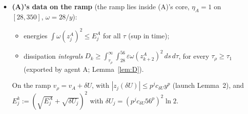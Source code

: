 \documentclass[11pt]{article}
\theoremstyle{remark}\newtheorem{remark}[theorem]{Remark}
\begin{document}
\begin{itemize}[leftmargin=*,itemsep=2pt]
\item \textbf{(A)'s data on the ramp} (the ramp lies inside (A)'s core, $\eta_A=1$ on $[28,350]$, $\omega=28/y$):
  \begin{itemize}[itemsep=0pt]
  \item energies $\int\omega(z_j^A)^2\le E^A_j$ for all $\tau$ (sup in time);
  \item dissipation \emph{integrals} $D_k\ge\int_{\tau_\rho}^\infty\!\int_{28}^{56}\varepsilon\omega(z^A_{k+2})^2\,ds\,d\tau$, for every $\tau_\rho\ge\tau_1$ (exported by agent A; Lemma~\ref{lem:D}).
  \end{itemize}
  On the ramp $v_\rho=v_A+\delta U$, with $|z_j(\delta U)|\le p^jc_{\delta U}y^p$ (launch Lemma~2), and $E^k_j:=(\sqrt{E^A_j}+\sqrt{\delta U_j})^2$ with $\delta U_j=(p^jc_{\delta U}56^p)^2\ln2$.
\end{itemize}
\end{document}
